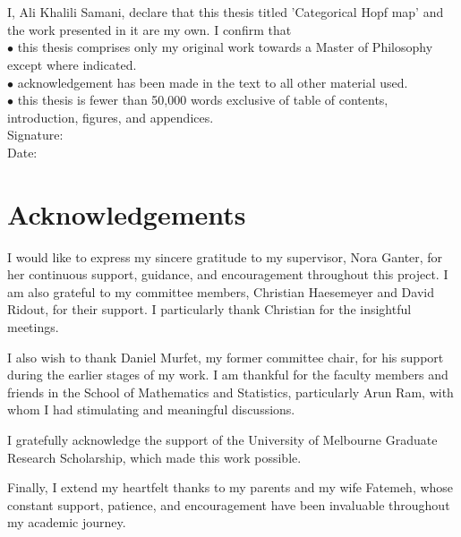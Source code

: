 \documentclass{article}
\theoremstyle{plain}
\theoremstyle{definition}
\begin{document}
\section*{}
{\large I, Ali Khalili Samani, declare that this thesis titled 'Categorical Hopf map' and the work presented in it are my own. I confirm that \\
$\bullet$ this thesis comprises only my original work towards a Master of Philosophy except where indicated. \\
$\bullet$ acknowledgement has been made in the text to all other material used. \\
$\bullet$ this thesis is fewer than 50,000 words exclusive of table of contents, introduction, figures, and appendices. \\[1.5cm]
Signature: \\
Date:}

\newpage
%
\section*{\centering \huge Acknowledgements}
I would like to express my sincere gratitude to my supervisor, Nora Ganter, for her continuous support, guidance, and encouragement throughout this project. I am also grateful to my committee members, Christian Haesemeyer and David Ridout, for their support. I particularly thank Christian for the insightful meetings.

I also wish to thank Daniel Murfet, my former committee chair, for his support during the earlier stages of my work. I am thankful for the faculty members and friends in the School of Mathematics and Statistics, particularly Arun Ram, with whom I had stimulating and meaningful discussions.

I gratefully acknowledge the support of the University of Melbourne Graduate Research Scholarship, which made this work possible.

Finally, I extend my heartfelt thanks to my parents and my wife Fatemeh, whose constant support, patience, and encouragement have been invaluable throughout my academic journey.

\newpage
\tableofcontents

\newpage
%
\end{document}
